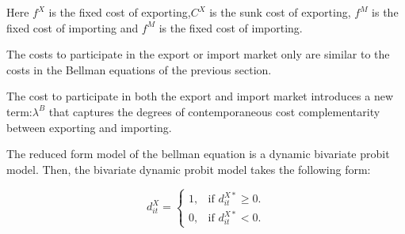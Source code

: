 \documentclass[12pt]{article}
\begin{document}
Here $f^{X}$ is the fixed cost of exporting,$C^{X}$ is the sunk cost
of exporting, $f^{M}$ is the fixed cost of importing and $f^{M}$ is the
fixed cost of importing.

The costs to participate in the export or import market only are
similar to the costs in the Bellman equations of the previous
section. 

The cost to participate in both the export and import market
introduces a new term:$ \lambda^B$  that captures the degrees of
contemporaneous cost complementarity between exporting and importing. 

The reduced form model of the bellman equation is a dynamic bivariate
probit model.  Then, the bivariate dynamic probit model  takes the following form:

\begin{equation}
  d_{it}^{X}=\begin{cases}
   1 , & \text{if $d_{it}^{X*}\geq 0$}.\\
   0 , & \text{if $d_{it}^{X*}<  0$}.
  \end{cases}
\end{equation}
\end{document}
